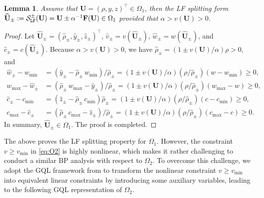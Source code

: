 \documentclass[times,final]{elsarticle}
\newtheorem{lemma}[theorem]{Lemma}
\numberwithin{equation}{section}
\theoremstyle{definition}
\theoremstyle{remark}
\newcommand{\BU}{\mathbf{U}}
\newcommand{\hBU}{\widehat{\BU}}
\newcommand{\BF}{\mathbf{F}}
\begin{document}
\begin{lemma}
	\label{L1}
	Assume that $\BU = (\rho,y,z)^\top \in \Omega_1$, then the LF splitting form $\hBU_\pm := \mathcal{S}^\pm_{\tt LF}(\BU) = \BU \pm \alpha^{-1} \BF (\BU) \in \Omega_1$ provided that $\alpha > v(\BU) > 0$.
\end{lemma}

\begin{proof}
	Let $\hBU_\pm = (\hat{\rho}_\pm,\hat{y}_\pm,\hat{z}_\pm)^\top$, $\hat{v}_\pm = v(\hBU_\pm)$, $\hat{w}_\pm = w(\hBU_\pm)$, and $\hat{c}_\pm = c(\hBU_\pm)$.
	Because $\alpha > v(\BU) > 0$, we have $\hat{\rho}_\pm = \left( 1 \pm v(\BU)/\alpha \right) \rho > 0$, and
	\begin{equation*}
		\begin{aligned}
			\hat{w}_\pm - w_{\min} 
			& = {(\hat{y}_\pm - \hat{\rho}_\pm \, w_{\min})}/{\hat{\rho}_\pm} 
			= \left( 1 \pm {v(\BU)}/{\alpha} \right) \left( {\rho}/{\hat{\rho}_\pm}\right) (w - w_{\min}) \geq 0, 
			\\
			w_{\max} - \hat{w}_\pm 
			& = {(\hat{\rho}_\pm \, w_{\max} - \hat{y}_\pm)}/{\hat{\rho}_\pm} 
			= \left( 1 \pm {v(\BU)}/{\alpha} \right) \left( {\rho}/{\hat{\rho}_\pm} \right) (w_{\max} - w) \geq 0, 
			\\
			\hat{c}_\pm - c_{\min}  
			& = {(\hat{z}_\pm - \hat{\rho}_\pm \, c_{\min})}{\hat{\rho}_\pm} 
			= \left( 1 \pm {v(\BU)}/{\alpha} \right) \left( {\rho}/{\hat{\rho}_\pm} \right) (c - c_{\min}) \geq 0, 
			\\
			c_{\max} - \hat{c}_\pm 
			& = {(\hat{\rho}_\pm \, c_{\max} - \hat{z}_\pm)}/{\hat{\rho}_\pm} 
			= \left( 1 \pm {v(\BU)}/{\alpha} \right) \left( {\rho}/{\hat{\rho}_\pm} \right) (c_{\max} - c) \geq 0. 
		\end{aligned}
	\end{equation*}
	In summary, $\hBU_\pm \in \Omega_1$. The proof is completed.
\end{proof}

The above  proves the LF splitting property for $\Omega_1$. However, the constraint $v \ge v_{\min}$ in \eqref{eq:O2} is highly nonlinear, which makes it rather challenging to conduct a similar BP analysis with respect to $\Omega_2$. To overcome this challenge, we adopt the GQL framework from \cite{wu2023geometric} to transform the nonlinear constraint $v \ge v_{\min}$ into equivalent linear constraints by introducing some auxiliary variables, leading to the following GQL representation of $\Omega_2$.
\end{document}
